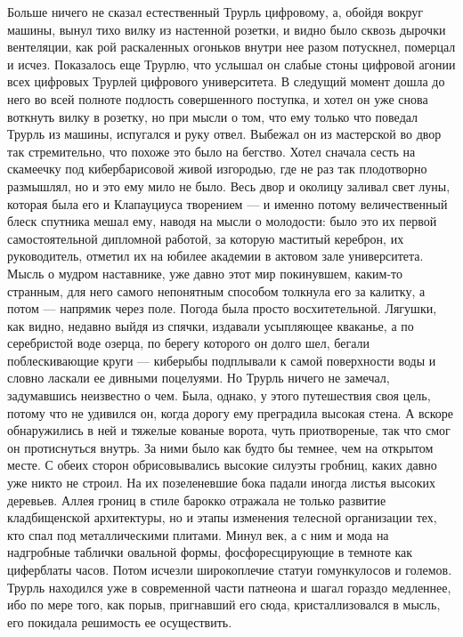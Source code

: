 Больше ничего не сказал естественный Трурль цифровому, а,
обойдя вокруг машины, вынул тихо вилку из настенной розетки,
и видно было сквозь дырочки вентеляции, как рой раскаленных
огоньков внутри нее разом потускнел, померцал и исчез.
Показалось еще Трурлю, что услышал он слабые стоны цифровой
агонии всех цифровых Трурлей цифрового университета. В
следущий момент дошла до него во всей полноте подлость
совершенного поступка, и хотел он уже снова воткнуть вилку в
розетку, но при мысли о том, что ему только что поведал
Трурль из машины, испугался и руку отвел. Выбежал он из
мастерской во двор так стремительно, что похоже это было на
бегство. Хотел сначала сесть на скамеечку под кибербарисовой
живой изгородью, где не раз так плодотворно размышлял, но и
это ему мило не было. Весь двор и околицу заливал свет луны,
которая была его и Клапауциуса творением --- и именно потому
величественный блеск спутника мешал ему, наводя на мысли о
молодости: было это их первой самостоятельной дипломной
работой, за которую маститый кереброн, их руководитель,
отметил их на юбилее академии в актовом зале университета.
Мысль о мудром наставнике, уже давно этот мир покинувшем,
каким-то странным, для него самого непонятным способом
толкнула его за калитку, а потом --- напрямик через поле.
Погода была просто восхитетельной. Лягушки, как видно,
недавно выйдя из спячки, издавали усыпляющее кваканье, а по
серебристой воде озерца, по берегу которого он долго шел,
бегали поблескивающие круги --- киберыбы подплывали к самой
поверхности воды и словно ласкали ее дивными поцелуями. Но
Трурль ничего не замечал, задумавшись неизвестно о чем.
Была, однако, у этого путешествия своя цель, потому что не
удивился он, когда дорогу ему преградила высокая стена. А
вскоре обнаружились в ней и тяжелые кованые ворота, чуть
приотвореные, так что смог он протиснуться внутрь. За ними
было как будто бы темнее, чем на открытом месте. С обеих
сторон обрисовывались высокие силуэты гробниц, каких давно
уже никто не строил. На их позеленевшие бока падали иногда
листья высоких деревьев. Аллея грониц в стиле барокко
отражала не только развитие кладбищенской архитектуры, но и
этапы изменения телесной организации тех, кто спал под
металлическими плитами. Минул век, а с ним и мода на
надгробные таблички овальной формы, фосфоресцирующие в
темноте как циферблаты часов. Потом исчезли широкоплечие
статуи гомункулосов и големов. Трурль находился уже в
современной части патнеона и шагал гораздо медленнее, ибо по
мере того, как порыв, пригнавший его сюда, кристаллизовался
в мысль, его покидала решимость ее осуществить.

